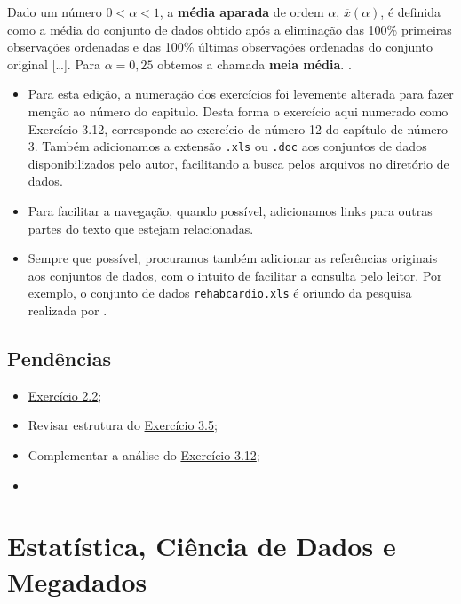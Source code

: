 \documentclass[
]{latex/krantz}
\providecommand{\tightlist}{%
  \setlength{\itemsep}{0pt}\setlength{\parskip}{0pt}}
\renewenvironment{quote}{\begin{VF}}{\end{VF}}
\theoremstyle{definition}
\theoremstyle{definition}
\theoremstyle{definition}
\theoremstyle{definition}
\theoremstyle{remark}
\begin{document}
\begin{quote}
Dado um número \(0 < \alpha < 1\), a \textbf{média aparada} de ordem \(\alpha\), \(\overline{x}(\alpha)\), é definida como a média do conjunto de dados obtido após a eliminação das 100\% primeiras observações ordenadas e das 100\% últimas observações ordenadas do conjunto original {[}\ldots{]}. Para \(\alpha = 0,25\) obtemos a chamada \textbf{meia média}. \citep[p.~47]{MorettinSinger2022}.
\end{quote}

\begin{itemize}
\tightlist
\item
  Para esta edição, a numeração dos exercícios foi levemente alterada para fazer menção ao número do capitulo. Desta forma o exercício aqui numerado como Exercício 3.12, corresponde ao exercício de número 12 do capítulo de número 3. Também adicionamos a extensão \texttt{.xls} ou \texttt{.doc} aos conjuntos de dados disponibilizados pelo autor, facilitando a busca pelos arquivos no diretório de dados.
\item
  Para facilitar a navegação, quando possível, adicionamos links para outras partes do texto que estejam relacionadas.
\item
  Sempre que possível, procuramos também adicionar as referências originais aos conjuntos de dados, com o intuito de facilitar a consulta pelo leitor. Por exemplo, o conjunto de dados \texttt{rehabcardio.xls} é oriundo da pesquisa realizada por \citet{CarvalhoEtAl2007}.
\end{itemize}

\hypertarget{penduxeancias}{%
\section*{Pendências}\label{penduxeancias}}

\begin{itemize}
\tightlist
\item
  \protect\hyperlink{exr2-2}{Exercício 2.2};
\item
  Revisar estrutura do \protect\hyperlink{exr3-5}{Exercício 3.5};
\item
  Complementar a análise do \protect\hyperlink{exr3-12}{Exercício 3.12};
\item
\end{itemize}

\mainmatter

\hypertarget{estatuxedstica-ciuxeancia-de-dados-e-megadados}{%
\chapter{Estatística, Ciência de Dados e Megadados}\label{estatuxedstica-ciuxeancia-de-dados-e-megadados}}
\end{document}
